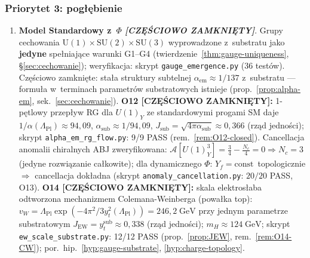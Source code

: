 \subsubsection{Priorytet 3: pog\l{}\k{e}bienie}

\begin{enumerate}[label=\textbf{O\arabic*}., start=9, nosep]
  \item \textbf{Model Standardowy z~$\Phi$
        \emph{[CZ\k{E}\'SCIOWO ZAMKNI\k{E}TY]}}.
        Grupy cechowania $\mathrm{U}(1)\times\mathrm{SU}(2)\times\mathrm{SU}(3)$
        wyprowadzone z~substratu jako \textbf{jedyne} spe\l{}niaj\k{a}ce
        warunki G1--G4 (twierdzenie~\ref{thm:gauge-uniqueness},
        \S\ref{sec:cechowanie}); weryfikacja: skrypt
        \texttt{gauge\_emergence.py} (36 test\'ow).
        Cz\k{e}\'sciowo zamkni\k{e}te: sta\l{}a struktury subtelnej
        $\alpha_{\mathrm{em}} \approx 1/137$ z~substratu --- formu\l{}a
        w~terminach parametr\'ow substratowych istnieje
        (prop.~\ref{prop:alpha-em}, sek.~\ref{sec:cechowanie}).
        \textbf{O12 [CZ\k{E}\'SCIOWO ZAMKNI\k{E}TY]:}
        1-p\k{e}tlowy przep\l{}yw RG dla $U(1)_Y$
        ze standardowymi progami SM daje
        $1/\alpha(\Lambda_\mathrm{Pl}) \approx 94{,}09$,
        $\alpha_{\mathrm{sub}} \approx 1/94{,}09$,
        $J_{\mathrm{sub}} = \sqrt{4\pi\alpha_{\mathrm{sub}}} \approx 0{,}366$
        (rz\k{a}d jedno\'sci);
        skrypt \texttt{alpha\_em\_rg\_flow.py}: 9/9 PASS
        (rem.~\ref{rem:O12-closed}).
        Cancellacja anomalii chiralnych ABJ zweryfikowana:
        $\mathcal{A}[U(1)_Y^3] = \tfrac{3}{4} - \tfrac{N_c}{4} = 0
        \Rightarrow N_c = 3$ (jedyne rozwi\k{a}zanie ca\l{}kowite);
        dla dynamicznego $\Phi$: $Y_f = \mathrm{const}$~topologicznie
        $\Rightarrow$ cancellacja dok\l{}adna
        (skrypt \texttt{anomaly\_cancellation.py}: $20/20$ PASS, O13).
        \textbf{O14 [CZ\k{E}\'SCIOWO ZAMKNI\k{E}TY]:}
        skala elektros\l{}aba odtworzona mechanizmem Colemana-Weinberga
        (powa\l{}ka top):
        $v_W = \Lambda_\mathrm{Pl}\exp(-4\pi^2/3y_t^2(\Lambda_\mathrm{Pl}))
        = 246{,}2\;\mathrm{GeV}$
        przy jednym parametrze substratowym
        $J_{\mathrm{EW}} = y_t^{\mathrm{sub}} \approx 0{,}338$
        (rz\k{a}d jedno\'sci); $m_H \approx 124\;\mathrm{GeV}$;
        skrypt \texttt{ew\_scale\_substrate.py}: 12/12 PASS
        (prop.~\ref{prop:JEW}, rem.~\ref{rem:O14-CW});
        por.\ hip.~\ref{hyp:gauge-substrate}, \ref{hyp:charge-topology}.


\end{enumerate}
